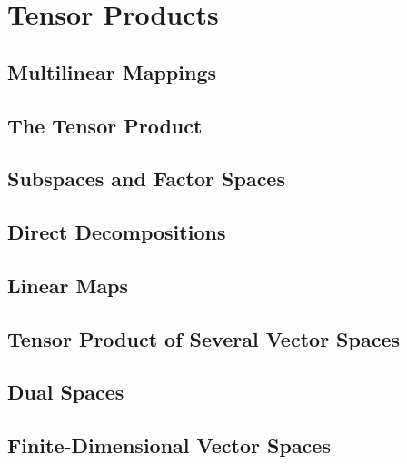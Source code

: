 \chapter{Tensor Products}

\section{Multilinear Mappings}

\section{The Tensor Product}

\section{Subspaces and Factor Spaces}

\section{Direct Decompositions}

\section{Linear Maps}

\section{Tensor Product of Several Vector Spaces}

\section{Dual Spaces}

\section{Finite-Dimensional Vector Spaces}
